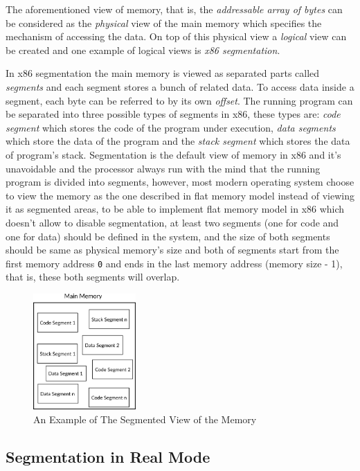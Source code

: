 The aforementioned view of memory, that is, the \emph{addressable array
of bytes} can be considered as the \emph{physical} view of the main
memory which specifies the mechanism of accessing the data. On top of
this physical view a \emph{logical} view can be created and one example
of logical views is \emph{x86 segmentation}.

In x86 segmentation the main memory is viewed as separated parts called
\emph{segments} and each segment stores a bunch of related data. To
access data inside a segment, each byte can be referred to by its own
\emph{offset}. The running program can be separated into three possible
types of segments in x86, these types are: \emph{code segment} which
stores the code of the program under execution, \emph{data segments}
which store the data of the program and the \emph{stack segment} which
stores the data of program's stack. Segmentation is the default view of
memory in x86 and it's unavoidable and the processor always run with the
mind that the running program is divided into segments, however, most
modern operating system choose to view the memory as the one described
in flat memory model instead of viewing it as segmented areas, to be
able to implement flat memory model in x86 which doesn't allow to
disable segmentation, at least two segments (one for code and one for
data) should be defined in the system, and the size of both segments
should be same as physical memory's size and both of segments start from
the first memory address \lstinline!0! and ends in the last memory
address (memory size - 1), that is, these both segments will overlap.

\begin{figure}
\centering
\includegraphics[width=0.35000\textwidth]{Figures/x86-ch/memory-segmented-view.png}
\caption{An Example of The Segmented View of the
Memory}\label{fig:memory_segmented_view}
\end{figure}

\subsection{Segmentation in Real Mode}\label{segmentation-in-real-mode}

